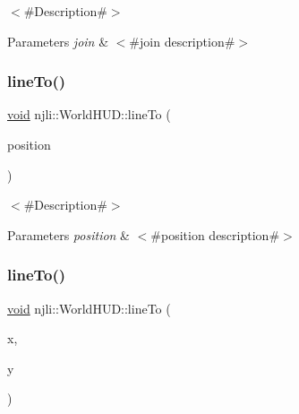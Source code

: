 $<$\#\+Description\#$>$


\begin{DoxyParams}{Parameters}
{\em join} & $<$\#join description\#$>$ \\
\hline
\end{DoxyParams}
\mbox{\label{classnjli_1_1_world_h_u_d_aba89dd5d668b6f7de9b943d13411961f}} 
\subsubsection{\texorpdfstring{line\+To()}{lineTo()}\hspace{0.1cm}{\footnotesize\ttfamily [1/2]}}
{\footnotesize\ttfamily \mbox{\hyperlink{_thread_8h_af1e856da2e658414cb2456cb6f7ebc66}{void}} njli\+::\+World\+H\+U\+D\+::line\+To (\begin{DoxyParamCaption}\item[{const bt\+Vector2 \&}]{position }\end{DoxyParamCaption})}

$<$\#\+Description\#$>$


\begin{DoxyParams}{Parameters}
{\em position} & $<$\#position description\#$>$ \\
\hline
\end{DoxyParams}
\mbox{\label{classnjli_1_1_world_h_u_d_a95cafc21277f080c5a19d56ec051010e}} 
\subsubsection{\texorpdfstring{line\+To()}{lineTo()}\hspace{0.1cm}{\footnotesize\ttfamily [2/2]}}
{\footnotesize\ttfamily \mbox{\hyperlink{_thread_8h_af1e856da2e658414cb2456cb6f7ebc66}{void}} njli\+::\+World\+H\+U\+D\+::line\+To (\begin{DoxyParamCaption}\item[{\mbox{\hyperlink{_util_8h_a5f6906312a689f27d70e9d086649d3fd}{f32}}}]{x,  }\item[{\mbox{\hyperlink{_util_8h_a5f6906312a689f27d70e9d086649d3fd}{f32}}}]{y }\end{DoxyParamCaption})}

